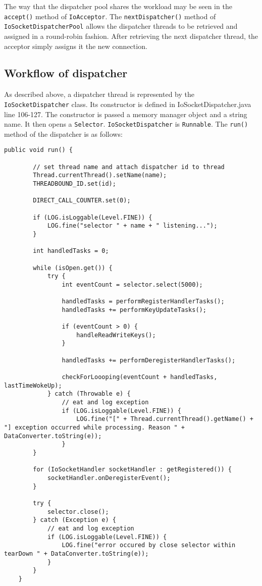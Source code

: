\documentclass[letterpaper,12pt]{article}
\begin{document}
The way that the dispatcher pool shares the workload may be seen in the \texttt{accept()} method of \texttt{IoAcceptor}. The \texttt{nextDispatcher()} method of \texttt{IoSocketDispatcherPool} allows the dispatcher threads to be retrieved and assigned in a round-robin fashion. After retrieving the next dispatcher thread, the acceptor simply assigns it the new connection.

\subsection{Workflow of dispatcher}

As described above, a dispatcher thread is represented by the \texttt{IoSocketDispatcher} class. Its constructor is defined in IoSocketDispatcher.java line 106-127. The constructor is passed a memory manager object and a string name. It then opens a \texttt{Selector}. \texttt{IoSocketDispatcher} is \texttt{Runnable}. The \texttt{run()} method of the dispatcher is as follows:

\begin{lstlisting}[label=dispatcherLoop,caption=Main loop of dispatcher]
    public void run() {
        
        // set thread name and attach dispatcher id to thread
        Thread.currentThread().setName(name);
        THREADBOUND_ID.set(id);

        DIRECT_CALL_COUNTER.set(0);

        if (LOG.isLoggable(Level.FINE)) {
            LOG.fine("selector " + name + " listening...");
        }

        int handledTasks = 0;

        while (isOpen.get()) {
            try {
                int eventCount = selector.select(5000);

                handledTasks = performRegisterHandlerTasks();
                handledTasks += performKeyUpdateTasks();

                if (eventCount > 0) {
                    handleReadWriteKeys();
                }

                handledTasks += performDeregisterHandlerTasks();

                checkForLoooping(eventCount + handledTasks, lastTimeWokeUp);
            } catch (Throwable e) {
                // eat and log exception
                if (LOG.isLoggable(Level.FINE)) {
                    LOG.fine("[" + Thread.currentThread().getName() + "] exception occurred while processing. Reason " + DataConverter.toString(e));
                }
        }
        
        for (IoSocketHandler socketHandler : getRegistered()) {
            socketHandler.onDeregisterEvent();
        }

        try {
            selector.close();
        } catch (Exception e) {
            // eat and log exception
            if (LOG.isLoggable(Level.FINE)) {
                LOG.fine("error occured by close selector within tearDown " + DataConverter.toString(e));
            }
        }
    }
\end{lstlisting}
\end{document}
